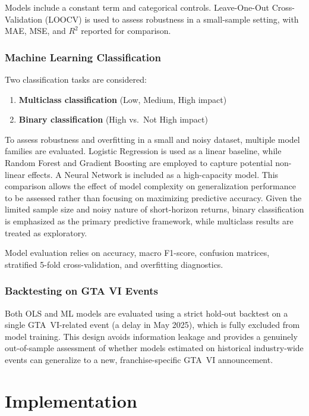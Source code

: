 \documentclass[11pt,a4paper]{article}
\begin{document}
Models include a constant term and categorical controls. Leave-One-Out Cross-Validation (LOOCV) is used to assess robustness in a small-sample setting, with MAE, MSE, and $R^2$ reported for comparison.

\subsubsection{Machine Learning Classification}

Two classification tasks are considered:
\begin{enumerate}[topsep=2pt]
    \item \textbf{Multiclass classification} (Low, Medium, High impact)
    \item \textbf{Binary classification} (High vs.\ Not High impact)
\end{enumerate}

To assess robustness and overfitting in a small and noisy dataset, multiple model families are evaluated. Logistic Regression is used as a linear baseline, while Random Forest and Gradient Boosting are employed to capture potential non-linear effects. A Neural Network is included as a high-capacity model. This comparison allows the effect of model complexity on generalization performance to be assessed rather than focusing on maximizing predictive accuracy.  Given the limited sample size and noisy nature of short-horizon returns, binary classification is emphasized as the primary predictive framework, while multiclass results are treated as exploratory.

Model evaluation relies on accuracy, macro F1-score, confusion matrices, stratified 5-fold cross-validation, and overfitting diagnostics.

\subsubsection{Backtesting on GTA VI Events}

Both OLS and ML models are evaluated using a strict hold-out backtest on a single GTA~VI-related event (a delay in May 2025), which is fully excluded from model training. This design avoids information leakage and provides a genuinely out-of-sample assessment of whether models estimated on historical industry-wide events can generalize to a new, franchise-specific GTA~VI announcement.

\section{Implementation}
\end{document}
